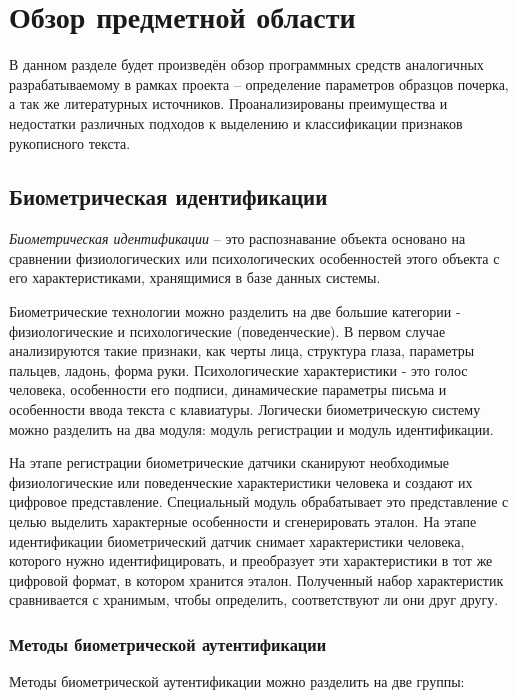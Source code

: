 \section{Обзор предметной области}
\label{sec:domain:intro}

В данном разделе будет произведён обзор программных средств аналогичных разрабатываемому в рамках проекта – определение параметров образцов почерка, а так же литературных источников. Проанализированы преимущества и недостатки различных подходов к выделению и классификации признаков рукописного текста.

\subsection{Биометрическая идентификации}
\label{sub:domain:bioauthentication}
\emph{Биометрическая идентификации} -- это распознавание объекта основано на сравнении физиологических
или психологических особенностей этого объекта с его характеристиками, хранящимися в
базе данных системы.

Биометрические технологии можно разделить на две большие категории - физиологические и психологические (поведенческие). В первом случае анализируются такие признаки, как черты лица, структура глаза, параметры пальцев, ладонь, форма руки. Психологические характеристики - это голос человека, особенности его подписи, динамические параметры письма и особенности ввода текста с клавиатуры.
Логически биометрическую систему можно разделить на два модуля: модуль регистрации и модуль идентификации.

На этапе регистрации биометрические датчики сканируют необходимые физиологические или поведенческие характеристики человека и создают их цифровое представление. Специальный модуль обрабатывает это представление с целью выделить характерные особенности и сгенерировать эталон. На этапе идентификации биометрический датчик снимает характеристики человека, которого нужно идентифицировать, и преобразует эти характеристики в тот же цифровой формат, в котором хранится эталон. Полученный набор характеристик сравнивается с хранимым, чтобы определить, соответствуют ли они друг другу.

\subsubsection{Методы биометрической аутентификации}
Методы биометрической аутентификации можно разделить на две группы:

